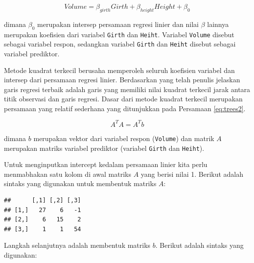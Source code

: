 \documentclass[
]{book}
\newenvironment{Shaded}{\begin{snugshade}}{\end{snugshade}}
\newcommand{\AttributeTok}[1]{\textcolor[rgb]{0.13,0.29,0.53}{#1}}
\newcommand{\CommentTok}[1]{\textcolor[rgb]{0.56,0.35,0.01}{\textit{#1}}}
\newcommand{\DecValTok}[1]{\textcolor[rgb]{0.00,0.00,0.81}{#1}}
\newcommand{\FunctionTok}[1]{\textcolor[rgb]{0.13,0.29,0.53}{\textbf{#1}}}
\newcommand{\NormalTok}[1]{#1}
\newcommand{\OtherTok}[1]{\textcolor[rgb]{0.56,0.35,0.01}{#1}}
\newcommand{\SpecialCharTok}[1]{\textcolor[rgb]{0.81,0.36,0.00}{\textbf{#1}}}
\theoremstyle{definition}
\theoremstyle{definition}
\theoremstyle{definition}
\theoremstyle{definition}
\theoremstyle{remark}
\begin{document}
\begin{equation}
Volume=\beta_{girth} Girth+\beta_{height}Height+\beta_0
 \label{eq:trees}
\end{equation}

dimana \(\beta_0\) merupakan intersep persamaan regresi linier dan nilai \(\beta\) lainnya merupakan koefisien dari variabel \texttt{Girth} dan \texttt{Heiht}. Variabel \texttt{Volume} disebut sebagai variabel respon, sedangkan variabel \texttt{Girth} dan \texttt{Heiht} disebut sebagai variabel prediktor.

Metode kuadrat terkecil berusaha memperoleh seluruh koefisien variabel dan intersep dari persamaan regresi linier. Berdasarkan yang telah penulis jelaskan garis regresi terbaik adalah garis yang memiliki nilai kuadrat terkecil jarak antara titik observasi dan garis regresi. Dasar dari metode kuadrat terkecil merupakan persamaan yang relatif sederhana yang ditunjukkan pada Persamaan \eqref{eq:trees2}.

\begin{equation}
A^{T}A=A^{T}b
 \label{eq:trees2}
\end{equation}

dimana \(b\) merupakan vektor dari variabel respon (\texttt{Volume}) dan matrik \(A\) merupakan matriks variabel prediktor (variabel \texttt{Girth} dan \texttt{Heiht}).

Untuk menginputkan intercept kedalam persamaan linier kita perlu menmabhakan satu kolom di awal matriks \(A\) yang berisi nilai 1. Berikut adalah sintaks yang digunakan untuk membentuk matriks \(A\):

\begin{Shaded}
\end{Shaded}

\begin{verbatim}
##      [,1] [,2] [,3]
## [1,]   27    6   -1
## [2,]    6   15    2
## [3,]    1    1   54
\end{verbatim}

Langkah selanjutnya adalah membentuk matriks \(b\). Berikut adalah sintaks yang digunakan:
\end{document}
